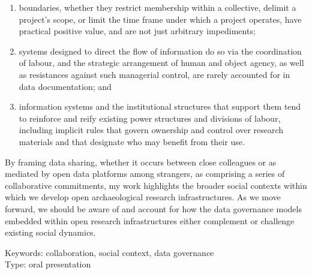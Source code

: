 \documentclass[a4paper]{article}
\begin{document}
\begin{enumerate}

\item boundaries, whether they restrict membership within a collective, delimit a project's scope, or limit the time frame under which a project operates, have practical positive value, and are not just arbitrary impediments;

\item systems designed to direct the flow of information do so via the coordination of labour, and the strategic arrangement of human and object agency, as well as resistances against such managerial control, are rarely accounted for in data documentation; and

\item information systems and the institutional structures that support them tend to reinforce and reify existing power structures and divisions of labour, including implicit rules that govern ownership and control over research materials and that designate who may benefit from their use.

\end{enumerate}

By framing data sharing, whether it occurs between close colleagues or as mediated by open data platforms among strangers, as comprising a series of collaborative commitments, my work highlights the broader social contexts within which we develop open archaeological research infrastructures. As we move forward, we should be aware of and account for how the data governance models embedded within open research infrastructures either complement or challenge existing social dynamics.

\hspace{10pt}

\normalsize
\noindent
Keywords: collaboration, social context, data governance\\
Type: oral presentation

\printbibliography
\end{document}
